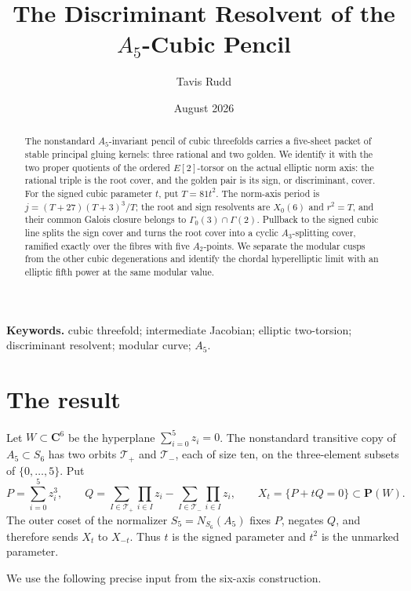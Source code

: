 \documentclass[11pt]{article}
\title{The Discriminant Resolvent of the \(A_5\)-Cubic Pencil}
\author{Tavis Rudd}
\date{August 2026}
\numberwithin{equation}{section}
\theoremstyle{definition}
\theoremstyle{remark}
\newcommand{\C}{\mathbf C}
\newcommand{\PP}{\mathbf P}
\begin{document}
\maketitle

\begin{abstract}
The nonstandard \(A_5\)-invariant pencil of cubic threefolds carries a
five-sheet packet of stable principal gluing kernels: three rational and
two golden.  We identify it with the two proper quotients of the ordered
\(E[2]\)-torsor on the actual elliptic norm axis: the rational triple is the
root cover, and the golden pair is its sign, or discriminant, cover.  For the
signed cubic parameter \(t\), put \(T=81t^2\).  The norm-axis period is
\(j=(T+27)(T+3)^3/T\); the root and sign resolvents are \(X_0(6)\) and
\(r^2=T\), and their common Galois closure belongs to
\(\Gamma_0(3)\cap\Gamma(2)\).  Pullback to the signed cubic line splits the
sign cover and turns the root cover into a cyclic \(A_3\)-splitting cover,
ramified exactly over the fibres with five \(A_2\)-points.  We separate the
modular cusps from the other cubic degenerations and identify the chordal
hyperelliptic limit with an elliptic fifth power at the same modular value.
\end{abstract}

\noindent\textbf{Keywords.} cubic threefold; intermediate Jacobian;
elliptic two-torsion; discriminant resolvent; modular curve; \(A_5\).

\section{The result}

Let \(W\subset\C^6\) be the hyperplane \(\sum_{i=0}^5z_i=0\).  The
nonstandard transitive copy of \(A_5\subset S_6\) has two orbits
\(\mathcal T_+\) and \(\mathcal T_-\), each of size ten, on the three-element
subsets of \(\{0,\ldots,5\}\).  Put
\[
 P=\sum_{i=0}^5z_i^3,
 \qquad
 Q=\sum_{I\in\mathcal T_+}\prod_{i\in I}z_i
       -\sum_{I\in\mathcal T_-}\prod_{i\in I}z_i,
 \qquad
 X_t=\{P+tQ=0\}\subset\PP(W).
\]
The outer coset of the normalizer \(S_5=N_{S_6}(A_5)\) fixes \(P\), negates
\(Q\), and therefore sends \(X_t\) to \(X_{-t}\).  Thus \(t\) is the signed
parameter and \(t^2\) is the unmarked parameter.

We use the following precise input from the six-axis construction.
\end{document}
